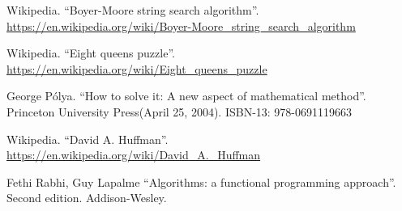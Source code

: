 \documentclass[b5paper]{ctexart}
\begin{document}
\begin{thebibliography}{99}
Wikipedia. ``Boyer-Moore string search algorithm''. \url{https://en.wikipedia.org/wiki/Boyer-Moore_string_search_algorithm}

Wikipedia. ``Eight queens puzzle''. \url{https://en.wikipedia.org/wiki/Eight_queens_puzzle}

George P\'{o}lya. ``How to solve it: A new aspect of mathematical method''. Princeton University Press(April 25, 2004). ISBN-13: 978-0691119663

Wikipedia. ``David A. Huffman''. \url{https://en.wikipedia.org/wiki/David_A._Huffman}

Fethi Rabhi, Guy Lapalme ``Algorithms: a functional programming approach''. Second edition. Addison-Wesley.

\end{thebibliography}

\expandafter\enddocument
\fi
\end{document}
